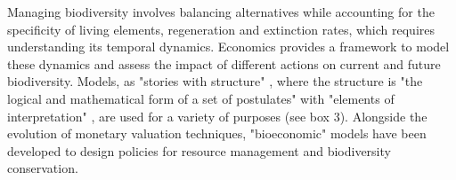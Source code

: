 
Managing biodiversity involves balancing alternatives while accounting for the specificity of living elements, regeneration and extinction rates, which requires understanding its temporal dynamics. Economics provides a framework to model these dynamics and assess the impact of different actions on current and future biodiversity. Models, as "stories with structure" \citep{GibbardVarian}, where the structure is "the logical and mathematical form of a set of postulates" with "elements of interpretation" \citep{GibbardVarian}, are used for a variety of purposes (see box 3).
Alongside the evolution of monetary valuation techniques, "bioeconomic" models have been developed to design policies for resource management and biodiversity conservation.\\


